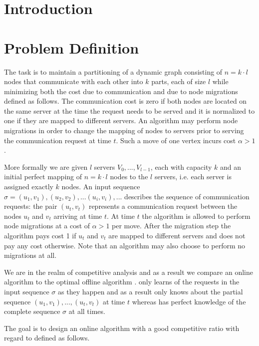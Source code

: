 \documentclass[a4paper,xcolor=dvipsnames, tikz, 12pt]{article}
\newcommand{\opt}{\text{O{\scriptsize PT}}}
\newcommand{\onl}{\text{O{\scriptsize NL}}}
\theoremstyle{definition}
\begin{document}
{
	\hypersetup{linkcolor=black}
	\tableofcontents
	\thispagestyle{empty}
	\clearpage
}


	\section{Introduction}
	
	
	\section{Problem Definition}
	
	The task is to maintain a partitioning of a dynamic graph consisting of $n=k\cdot l$ nodes that communicate with each other into $k$ parts, each of size $l$ while minimizing both the cost due to communication and due to node migrations defined as follows. The communication cost is zero if both nodes are located on the same server at the time the request needs to be served and it is normalized to one if they are mapped to different servers. An algorithm may perform node migrations in order to change the mapping of nodes to servers prior to serving the communication request at time $t$. Such a move of one vertex incurs cost $\alpha>1$.
	
	More formally we are given $l$ servers $V_0,...,V_{l-1}$, each with capacity $k$ and an initial perfect mapping of $n=k\cdot l$ nodes to the $l$ servers, i.e. each server is assigned exactly $k$ nodes. An input sequence $\sigma=(u_1, v_1), (u_2, v_2),...(u_i,v_i),...$ describes the sequence of communication requests: the pair $(u_t, v_t)$ represents a communication request between the nodes $u_t$ and $v_t$ arriving at time $t$. At time $t$ the algorithm is allowed to perform node migrations at a cost of $\alpha>1$ per move. After the migration step the algorithm pays cost 1 if $u_t$ and $v_t$ are mapped to different servers and does not pay any cost otherwise. Note that an algorithm may also choose to perform no migrations at all.
	
	We are in the realm of competitive analysis and as a result we compare an online algorithm \onl{} to the optimal offline algorithm \opt{}. \onl{} only learns of the requests in the input sequence $\sigma$ as they happen and as a result only knows about the partial sequence $(u_1,v_1),...,(u_t,v_t)$ at time $t$ whereas \opt{} has perfect knowledge of the complete sequence $\sigma$ at all times.
	
	The goal is to design an online algorithm \onl{} with a good competitive ratio with regard to \opt{} defined as follows.
	
\end{document}
